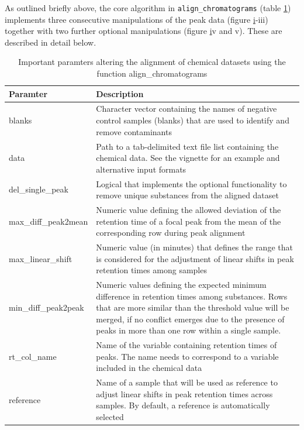 As outlined briefly above, the core algorithm in
\texttt{align\_chromatograms} (table \ref{table:parameter}) implements
three consecutive manipulations of the peak data (figure
\href{figure:workflow} i-iii) together with two further optional
manipulations (figure \href{figure:workflow} iv and v). These are
described in detail below.

\begin{table}[]
\centering
\caption{Important paramters altering the alignment of chemical datasets using the function align\_chromatograms}
\label{table:parameter}
\begin{tabular}{|p{5cm}|p{9cm}|} 
\textbf{Paramter} & \textbf{Description} \\ \midrule
blanks & Character vector containing the names of negative control samples (blanks) that are used to identify and remove contaminants \\
data & Path to a tab-delimited text file list containing the chemical data. See the vignette for an example and alternative input formats \\
del\_single\_peak & Logical that implements the optional functionality to remove unique substances from the aligned dataset \\
max\_diff\_peak2mean & Numeric value defining the allowed deviation of the retention time of a focal peak from the mean of the corresponding row during peak alignment \\
max\_linear\_shift & Numeric value (in minutes) that defines the range that is considered for the adjustment of linear shifts in peak retention times among samples \\
min\_diff\_peak2peak & Numeric values defining the expected minimum difference in retention times among substances. Rows that are more similar than the threshold value will be merged, if no conflict emerges due to the presence of peaks in more than one row within a single sample. \\
rt\_col\_name & Name of the variable containing retention times of peaks. The name needs to correspond to a variable included in the chemical data \\
reference & Name of a sample that will be used as reference to adjust linear shifts in peak retention times across samples. By default, a reference is automatically selected\\ \bottomrule
\end{tabular}
\end{table}\begin{figure}[htbp]
\centering

\end{figure}
